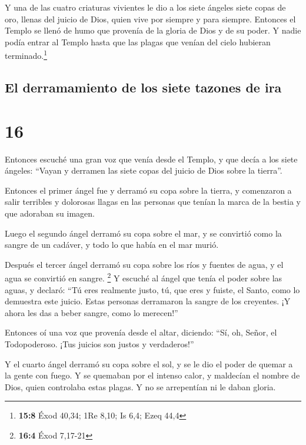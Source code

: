  Y una de las cuatro criaturas vivientes le dio a los
siete ángeles siete copas de oro, llenas del juicio de Dios, quien vive
por siempre y para siempre.  Entonces el Templo se llenó
de humo que provenía de la gloria de Dios y de su poder. Y nadie podía
entrar al Templo hasta que las plagas que venían del cielo hubieran
terminado.\footnote{\textbf{15:8} Éxod 40,34; 1Re 8,10; Is 6,4; Ezeq
  44,4}

\hypertarget{el-derramamiento-de-los-siete-tazones-de-ira}{%
\subsection{El derramamiento de los siete tazones de
ira}\label{el-derramamiento-de-los-siete-tazones-de-ira}}

\hypertarget{section-15}{%
\section{16}\label{section-15}}

 Entonces escuché una gran voz que venía desde el Templo,
y que decía a los siete ángeles: ``Vayan y derramen las siete copas del
juicio de Dios sobre la tierra''.

 Entonces el primer ángel fue y derramó su copa sobre la
tierra, y comenzaron a salir terribles y dolorosas llagas en las
personas que tenían la marca de la bestia y que adoraban su imagen.

 Luego el segundo ángel derramó su copa sobre el mar, y se
convirtió como la sangre de un cadáver, y todo lo que había en el mar
murió.

 Después el tercer ángel derramó su copa sobre los ríos y
fuentes de agua, y el agua se convirtió en sangre. \footnote{\textbf{16:4}
  Éxod 7,17-21}  Y escuché al ángel que tenía el poder
sobre las aguas, y declaró: ``Tú eres realmente justo, tú, que eres y
fuiste, el Santo, como lo demuestra este juicio.  Estas
personas derramaron la sangre de los creyentes. ¡Y ahora les das a beber
sangre, como lo merecen!''

 Entonces oí una voz que provenía desde el altar,
diciendo: ``Sí, oh, Señor, el Todopoderoso. ¡Tus juicios son justos y
verdaderos!''

 Y el cuarto ángel derramó su copa sobre el sol, y se le
dio el poder de quemar a la gente con fuego.  Y se
quemaban por el intenso calor, y maldecían el nombre de Dios, quien
controlaba estas plagas. Y no se arrepentían ni le daban gloria.

